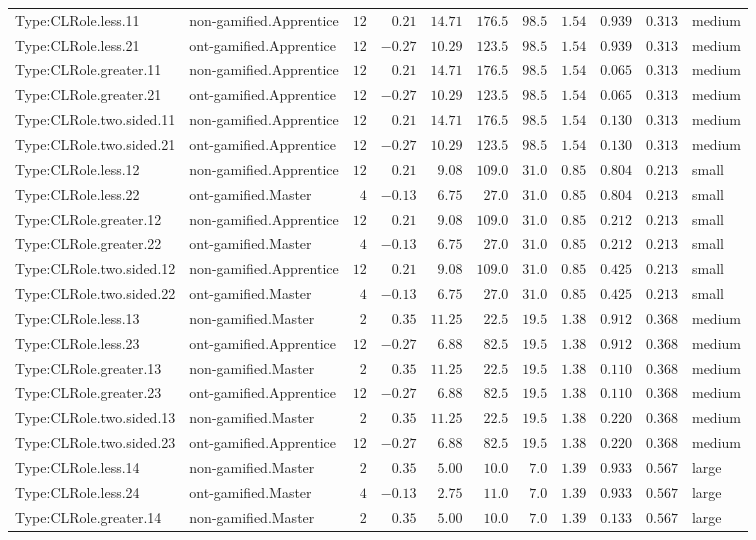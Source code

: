 \documentclass[6pt,a4paper]{article}
\begin{document}
{\begin{longtable}{llrrrrrrrrl}
Type:CLRole.less.11&non-gamified.Apprentice&$12$&$ 0.21$&$14.71$&$176.5$&$ 98.5$&$ 1.54$&$0.939$&$0.313$&medium\tabularnewline
Type:CLRole.less.21&ont-gamified.Apprentice&$12$&$-0.27$&$10.29$&$123.5$&$ 98.5$&$ 1.54$&$0.939$&$0.313$&medium\tabularnewline
Type:CLRole.greater.11&non-gamified.Apprentice&$12$&$ 0.21$&$14.71$&$176.5$&$ 98.5$&$ 1.54$&$0.065$&$0.313$&medium\tabularnewline
Type:CLRole.greater.21&ont-gamified.Apprentice&$12$&$-0.27$&$10.29$&$123.5$&$ 98.5$&$ 1.54$&$0.065$&$0.313$&medium\tabularnewline
Type:CLRole.two.sided.11&non-gamified.Apprentice&$12$&$ 0.21$&$14.71$&$176.5$&$ 98.5$&$ 1.54$&$0.130$&$0.313$&medium\tabularnewline
Type:CLRole.two.sided.21&ont-gamified.Apprentice&$12$&$-0.27$&$10.29$&$123.5$&$ 98.5$&$ 1.54$&$0.130$&$0.313$&medium\tabularnewline
Type:CLRole.less.12&non-gamified.Apprentice&$12$&$ 0.21$&$ 9.08$&$109.0$&$ 31.0$&$ 0.85$&$0.804$&$0.213$&small\tabularnewline
Type:CLRole.less.22&ont-gamified.Master&$ 4$&$-0.13$&$ 6.75$&$ 27.0$&$ 31.0$&$ 0.85$&$0.804$&$0.213$&small\tabularnewline
Type:CLRole.greater.12&non-gamified.Apprentice&$12$&$ 0.21$&$ 9.08$&$109.0$&$ 31.0$&$ 0.85$&$0.212$&$0.213$&small\tabularnewline
Type:CLRole.greater.22&ont-gamified.Master&$ 4$&$-0.13$&$ 6.75$&$ 27.0$&$ 31.0$&$ 0.85$&$0.212$&$0.213$&small\tabularnewline
Type:CLRole.two.sided.12&non-gamified.Apprentice&$12$&$ 0.21$&$ 9.08$&$109.0$&$ 31.0$&$ 0.85$&$0.425$&$0.213$&small\tabularnewline
Type:CLRole.two.sided.22&ont-gamified.Master&$ 4$&$-0.13$&$ 6.75$&$ 27.0$&$ 31.0$&$ 0.85$&$0.425$&$0.213$&small\tabularnewline
Type:CLRole.less.13&non-gamified.Master&$ 2$&$ 0.35$&$11.25$&$ 22.5$&$ 19.5$&$ 1.38$&$0.912$&$0.368$&medium\tabularnewline
Type:CLRole.less.23&ont-gamified.Apprentice&$12$&$-0.27$&$ 6.88$&$ 82.5$&$ 19.5$&$ 1.38$&$0.912$&$0.368$&medium\tabularnewline
Type:CLRole.greater.13&non-gamified.Master&$ 2$&$ 0.35$&$11.25$&$ 22.5$&$ 19.5$&$ 1.38$&$0.110$&$0.368$&medium\tabularnewline
Type:CLRole.greater.23&ont-gamified.Apprentice&$12$&$-0.27$&$ 6.88$&$ 82.5$&$ 19.5$&$ 1.38$&$0.110$&$0.368$&medium\tabularnewline
Type:CLRole.two.sided.13&non-gamified.Master&$ 2$&$ 0.35$&$11.25$&$ 22.5$&$ 19.5$&$ 1.38$&$0.220$&$0.368$&medium\tabularnewline
Type:CLRole.two.sided.23&ont-gamified.Apprentice&$12$&$-0.27$&$ 6.88$&$ 82.5$&$ 19.5$&$ 1.38$&$0.220$&$0.368$&medium\tabularnewline
Type:CLRole.less.14&non-gamified.Master&$ 2$&$ 0.35$&$ 5.00$&$ 10.0$&$  7.0$&$ 1.39$&$0.933$&$0.567$&large\tabularnewline
Type:CLRole.less.24&ont-gamified.Master&$ 4$&$-0.13$&$ 2.75$&$ 11.0$&$  7.0$&$ 1.39$&$0.933$&$0.567$&large\tabularnewline
Type:CLRole.greater.14&non-gamified.Master&$ 2$&$ 0.35$&$ 5.00$&$ 10.0$&$  7.0$&$ 1.39$&$0.133$&$0.567$&large\tabularnewline

\end{longtable}}
\end{document}
